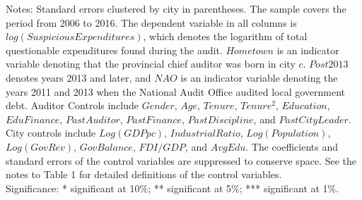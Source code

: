 \begin{table}[p]
\begin{threeparttable}
{\begin{tabular}{l*{4}{c}}
\hline\hline
\end{tabular}}
\captionsetup{justification=justified,labelformat=empty}
\begin{tablenotes}
\item Notes: Standard errors clustered by city in parentheses. The sample covers the period from 2006 to 2016. The dependent variable in all columns is $ log(SuspiciousExpenditures) $, which denotes the logarithm of total questionable expenditures found during the audit. $ Hometown $ is an indicator variable denoting that the provincial chief auditor was born in city $ c $. $ Post2013 $ denotes years 2013 and later, and $ NAO $ is an indicator variable denoting the years 2011 and 2013 when the National Audit Office audited local government debt. Auditor Controls include $ Gender $, $ Age $, $ Tenure $, $ Tenure^2 $, $ Education $, $ EduFinance $, $ PastAuditor $, $ PastFinance $, $ PastDiscipline $, and $ PastCityLeader $. City controls include $ Log(GDP pc) $, $ IndustrialRatio $, $ Log(Population) $, $ Log(GovRev) $, $ GovBalance $, $ FDI/GDP $, and $ AvgEdu $. The coefficients and standard errors of the control variables are suppressed to conserve space. See the notes to Table 1 for detailed definitions of the control variables.   \\  Significance: * significant at 10\%; ** significant at 5\%; *** significant at 1\%.
\end{tablenotes}
\end{threeparttable}\end{table}
